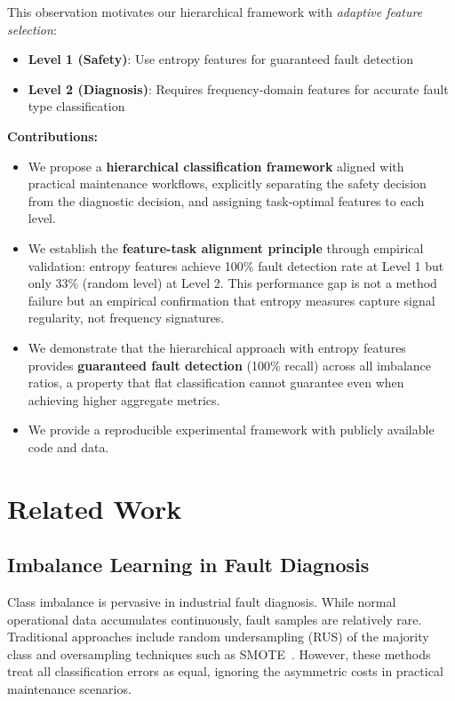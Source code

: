 \documentclass[11pt]{article}
\begin{document}
This observation motivates our hierarchical framework with \emph{adaptive feature selection}:

\begin{itemize}
    \item \textbf{Level 1 (Safety)}: Use entropy features for guaranteed fault detection
    \item \textbf{Level 2 (Diagnosis)}: Requires frequency-domain features for accurate fault type classification
\end{itemize}

\textbf{Contributions:}

\begin{itemize}
    \item We propose a \textbf{hierarchical classification framework} aligned with practical maintenance workflows, explicitly separating the safety decision from the diagnostic decision, and assigning task-optimal features to each level.

    \item We establish the \textbf{feature-task alignment principle} through empirical validation: entropy features achieve 100\% fault detection rate at Level 1 but only 33\% (random level) at Level 2. This performance gap is not a method failure but an empirical confirmation that entropy measures capture signal regularity, not frequency signatures.

    \item We demonstrate that the hierarchical approach with entropy features provides \textbf{guaranteed fault detection} (100\% recall) across all imbalance ratios, a property that flat classification cannot guarantee even when achieving higher aggregate metrics.

    \item We provide a reproducible experimental framework with publicly available code and data.
\end{itemize}

\section{Related Work}

\subsection{Imbalance Learning in Fault Diagnosis}
Class imbalance is pervasive in industrial fault diagnosis. While normal operational data accumulates continuously, fault samples are relatively rare. Traditional approaches include random undersampling (RUS) of the majority class and oversampling techniques such as SMOTE~\cite{chawla2002smote}. However, these methods treat all classification errors as equal, ignoring the asymmetric costs in practical maintenance scenarios.
\end{document}
